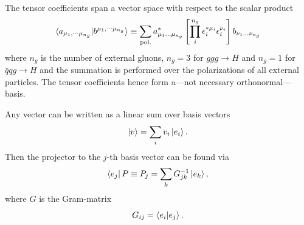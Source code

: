 The tensor coefficients span a vector space with respect to the scalar product
\begin{equation}
\braket{a_{\mu_1, \cdots \mu_{n_g}}| b^{\mu_1, \cdots \mu_{n_g}}} \equiv \sum_{\text{pol.}} a^*_{\mu_1 \ldots \mu_{n_g}} \left[\prod_i^{n_g} \epsilon_i^{*\mu_i} \epsilon_i^{\nu_i}  \right]  b_{\nu_1 \ldots \nu_{n_g}}
\label{eq:5:scala_product}
\end{equation}
where $n_g$ is the number of external gluons, \ie $n_g = 3$ for $ggg \rightarrow H$ and $n_g = 1$ for $\bar{q} q g \rightarrow H$ and the summation is performed over the polarizations of all external particles. The tensor coefficients hence form a---not necessary orthonormal---basis.

Any vector can be written as a linear sum over basis vectors
\begin{equation}
\ket{v} = \sum_i v_i \ket{e_i}.
\end{equation}
Then the projector to the $j$-th basis vector can be found via
\begin{equation}
\bra{e_j}P \equiv P_j = \sum_k G^{-1}_{jk} \ket{e_k},
\end{equation}
where $G$ is the Gram-matrix
\begin{equation}
G_{ij} = \braket{e_i | e_j}.
\end{equation}

